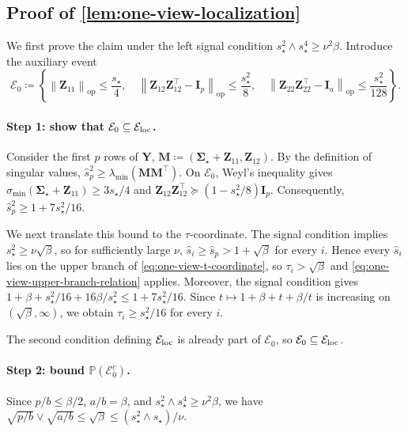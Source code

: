 \documentclass[11pt]{article}
\newcommand{\Pp}{\mathbb{P}}
\newcommand{\trans}{\top}
\newcommand{\opn}[1]{\left\lVert #1\right\rVert_{\mathrm{op}}}
\newcommand{\cE}{\mathcal{E}}
\begin{document}
\subsection{Proof of \cref{lem:one-view-localization}}
\label{app:proof-one-view-localization}

We first prove the claim under the left signal condition
$s_\star^2\wedge s_\star^4\ge\nu^2\beta$.
Introduce the auxiliary event
\begin{equation}
\label{eq:one-view-localization-aux}
  \cE_0
  \coloneqq
  \left\{
    \opn{\bm Z_{11}}\le\frac{s_\star}4,
    \quad
    \opn{
      \bm Z_{12}\bm Z_{12}^\trans-\bm I_p
    }
    \le\frac{s_\star^2}{8},
    \quad
    \opn{
      \bm Z_{22}\bm Z_{22}^\trans-\bm I_a
    }
    \le\frac{s_\star^2}{128}
  \right\}.
\end{equation}

\paragraph{Step 1: show that $\cE_0\subseteq\cE_{\rm loc}$.}
Consider the first $p$ rows of $\bm Y$,
$\bm M\coloneqq(\bm\Sigma_\star+\bm Z_{11},\bm Z_{12})$.
By the definition of singular values,
$\widehat s_p^2\ge\lambda_{\min}(\bm M\bm M^\trans)$.
On $\cE_0$, Weyl's inequality gives
$\sigma_{\min}(\bm\Sigma_\star+\bm Z_{11})\ge3s_\star/4$ and
$\bm Z_{12}\bm Z_{12}^\trans
\succeq(1-s_\star^2/8)\bm I_p$.
Consequently,
$\widehat s_p^2\ge1+7s_\star^2/16$.

We next translate this bound to the $\tau$-coordinate. The signal condition
implies $s_\star^2\ge\nu\sqrt\beta$, so for sufficiently large $\nu$,
$\widehat s_i\ge \widehat s_p>1+\sqrt\beta$ for every $i$. Hence every $\widehat s_i$ lies on the
upper branch of \cref{eq:one-view-t-coordinate}, so
$\tau_i>\sqrt\beta$ and \cref{eq:one-view-upper-branch-relation} applies.
Moreover, the signal condition gives
$1+\beta+s_\star^2/16+16\beta/s_\star^2
\le1+7s_\star^2/16$.
Since $t\mapsto1+\beta+t+\beta/t$ is increasing on
$(\sqrt\beta,\infty)$, we obtain
$\tau_i\ge s_\star^2/16$ for every $i$.

The second condition defining $\cE_{\rm loc}$ is already part of $\cE_0$,
so $\cE_0\subseteq\cE_{\rm loc}$.

\paragraph{Step 2: bound $\Pp(\cE_0^c)$.}
Since $p/b\le\beta/2$, $a/b=\beta$, and
$s_\star^2\wedge s_\star^4\ge\nu^2\beta$, we have
$\sqrt{p/b}\vee\sqrt{a/b}\le\sqrt\beta
\le(s_\star^2\wedge s_\star)/\nu$.
\end{document}
